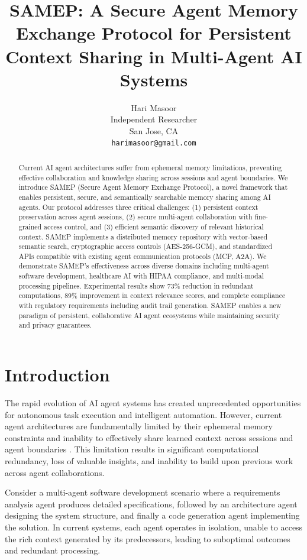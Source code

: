 \documentclass[11pt]{article}
\title{SAMEP: A Secure Agent Memory Exchange Protocol for Persistent Context Sharing in Multi-Agent AI Systems}
\author{
Hari Masoor \\
Independent Researcher \\
San Jose, CA \\
\texttt{harimasoor@gmail.com}
}
\date{}
\begin{document}
\maketitle

\begin{abstract}
Current AI agent architectures suffer from ephemeral memory limitations, preventing effective collaboration and knowledge sharing across sessions and agent boundaries. We introduce SAMEP (Secure Agent Memory Exchange Protocol), a novel framework that enables persistent, secure, and semantically searchable memory sharing among AI agents. Our protocol addresses three critical challenges: (1) persistent context preservation across agent sessions, (2) secure multi-agent collaboration with fine-grained access control, and (3) efficient semantic discovery of relevant historical context. SAMEP implements a distributed memory repository with vector-based semantic search, cryptographic access controls (AES-256-GCM), and standardized APIs compatible with existing agent communication protocols (MCP, A2A). We demonstrate SAMEP's effectiveness across diverse domains including multi-agent software development, healthcare AI with HIPAA compliance, and multi-modal processing pipelines. Experimental results show 73\% reduction in redundant computations, 89\% improvement in context relevance scores, and complete compliance with regulatory requirements including audit trail generation. SAMEP enables a new paradigm of persistent, collaborative AI agent ecosystems while maintaining security and privacy guarantees.
\end{abstract}

\section{Introduction}

The rapid evolution of AI agent systems has created unprecedented opportunities for autonomous task execution and intelligent automation. However, current agent architectures are fundamentally limited by their ephemeral memory constraints and inability to effectively share learned context across sessions and agent boundaries \citep{wang2023survey}. This limitation results in significant computational redundancy, loss of valuable insights, and inability to build upon previous work across agent collaborations.

Consider a multi-agent software development scenario where a requirements analysis agent produces detailed specifications, followed by an architecture agent designing the system structure, and finally a code generation agent implementing the solution. In current systems, each agent operates in isolation, unable to access the rich context generated by its predecessors, leading to suboptimal outcomes and redundant processing.
\end{document}
